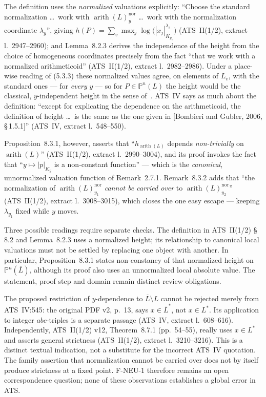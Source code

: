 \documentclass[11pt,a4paper]{article}
\theoremstyle{definition}
\theoremstyle{plain}
\theoremstyle{definition}
\newcommand{\arith}{\operatorname{arith}}
\newcommand{\anchor}[2]{(#1, extract l.~#2)}
\begin{document}
The definition uses the \emph{normalized} valuations explicitly: ``Choose the
standard normalization \ldots\ work with $\arith(L)^{\mathrm{nor}}_y$ \ldots\ work
with the normalization coordinate $\lambda_y$'', giving
$h(P) = \sum_v \max_j \log\bigl(|x_j|^{\lambda_v}_{K_{y_v}}\bigr)$
\anchor{ATS~II(1/2)}{2947--2960}; and Lemma~8.2.3 derives the independence of the
height from the choice of homogeneous coordinates precisely from the fact ``that
we work with a normalized arithmeticoid'' \anchor{ATS~II(1/2)}{2982--2986}. Under
a place-wise reading of (5.3.3) these normalized values agree, on elements of
$L_v$, with the standard ones --- for \emph{every} $y$ --- so for
$P \in \mathbb{P}^n(L)$ the height would be the classical, $y$-independent height
in the sense of~\cite{BombieriGubler2006}. ATS~IV says as much about the
definition: ``except for explicating the dependence on the arithmeticoid, the
definition of height \ldots\ is the same as the one given in [Bombieri and Gubler,
2006, \S\,1.5.1]'' \anchor{ATS~IV}{548--550}.

Proposition~8.3.1, however, asserts that
``$h_{\arith(L)}$ depends \emph{non-trivially} on $\arith(L)$''
\anchor{ATS~II(1/2)}{2990--3004}, and its proof invokes the fact that
``$y \mapsto |p|_{K_y}$ is a non-constant function'' --- which is the
\emph{canonical}, unnormalized valuation function of Remark~2.7.1. Remark~8.3.2
adds that ``the normalization of $\arith(L)^{\mathrm{nor}}_{y_1}$ \emph{cannot be
carried over} to $\arith(L)^{\mathrm{nor}}_{y_2}$''
\anchor{ATS~II(1/2)}{3008--3015}, which closes the one easy escape --- keeping
$\lambda_{y_1}$ fixed while $y$ moves.

Three possible readings require separate checks. The definition in
ATS~II(1/2) \S\,8.2 and Lemma~8.2.3 uses a normalized height; its
relationship to canonical local valuations must not be settled by replacing
one object with another. In particular, Proposition~8.3.1 states
non-constancy of that normalized height on $\mathbb P^n(\overline L)$,
although its proof also uses an unnormalized local absolute value. The
statement, proof step and domain remain distinct review obligations.

The proposed restriction of $y$-dependence to $\overline L\setminus L$
cannot be rejected merely from ATS~IV:545: the original PDF v2, p.~13,
says $x\in\overline L^*$, not $x\in L^*$. Its application to integer
$abc$-triples is a separate passage \anchor{ATS~IV}{608--616}.
Independently, ATS~II(1/2) v12, Theorem~8.7.1 (pp.~54--55), really
uses $x\in L^*$ and asserts general strictness
\anchor{ATS~II(1/2)}{3210--3216}.
This is a distinct textual indication, not a substitute for the incorrect
ATS~IV quotation. The family assertion that normalization cannot be carried
over does not by itself produce strictness at a fixed point.
F-NEU-1 therefore remains an open correspondence question; none of these
observations establishes a global error in ATS.
\end{document}
